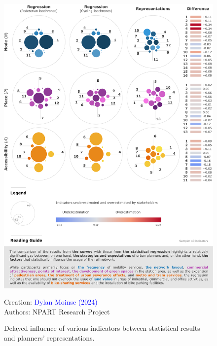 \begin{refsegment}
\begin{figure}[h!]\vspace*{4pt}
    \caption{Delayed influence of various indicators between statistical results and planners' representations.}
    \label{fig-chap6:ecarts-representation-indicateurs}
    \centerline{\includegraphics[width=1\columnwidth]{src/Figures/Chap-6/EN_NPART_Confrontation_Poids_Indicateurs.pdf}}
    \vspace{5pt}
    \begin{flushright}\scriptsize{
    Creation: \textcolor{blue}{Dylan Moinse (2024)}
    \\
    Authors: \acrshort{NPART} Research Project
    }\end{flushright}
\end{figure}


\end{refsegment}
